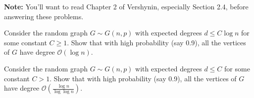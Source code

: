 \documentclass[12pt,letterpaper,cm]{hmcpset}
\begin{document}
\textbf{Note:} You'll want to read Chapter 2 of Vershynin, especially Section 2.4, before answering these problems.

\begin{problem}[Vershynin 2.4.2]
    Consider the random graph $G \sim G(n,p)$ with expected degrees $d\leq C \log n$ for some constant $C \geq 1$. Show that with high probability (say 0.9), all the vertices of $G$ have degree $\mathcal{O}(\log n)$.
\end{problem}

\begin{solution}
    \vfill
\end{solution}

\begin{problem}[Vershynin 2.4.3]
    Consider the random graph $G \sim G(n,p)$ with expected degrees $d\leq C$ for some constant $C > 1$. Show that with high probability (say 0.9), all the vertices of $G$ have degree $\mathcal{O}(\tfrac{\log n}{\log\log n})$.
\end{problem}

\begin{solution}
    \vfill
\end{solution}
\clearpage
\end{document}
